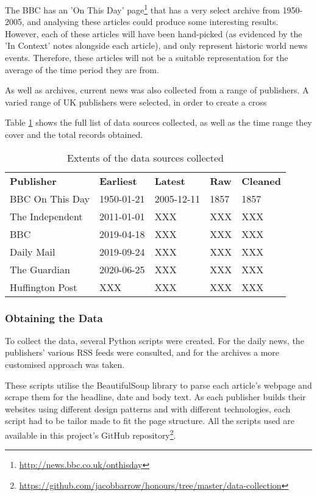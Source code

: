 The BBC has an 'On This Day' page\footnote{\url{http://news.bbc.co.uk/onthisday}} that has a very select archive from 1950-2005, and analysing these articles could produce some interesting results. However, each of these articles will have been hand-picked (as evidenced by the 'In Context' notes alongside each article), and only represent historic world news events. Therefore, these articles will not be a suitable representation for the average of the time period they are from.

As well as archives, current news was also collected from a range of publishers. A varied range of UK publishers were selected, in order to create a cross

Table \ref{tab:data-sources} shows the full list of data sources collected, as well as the time range they cover and the total records obtained.

\begin{table}[h]
\begin{tabular}{lllll}
\textbf{Publisher} & \textbf{Earliest} & \textbf{Latest} & \textbf{Raw} & \textbf{Cleaned} \\
BBC On This Day & 1950-01-21 & 2005-12-11 & 1857 & 1857 \\
The Independent & 2011-01-01 & XXX & XXX & XXX  \\
BBC & 2019-04-18 & XXX & XXX & XXX  \\
Daily Mail & 2019-09-24 & XXX & XXX & XXX \\
The Guardian & 2020-06-25 & XXX & XXX & XXX \\
Huffington Post & XXX & XXX & XXX & XXX \\
\end{tabular}
\caption{Extents of the data sources collected}
\label{tab:data-sources}
\end{table}

\subsubsection{Obtaining the Data} \label{obtaining-data}
To collect the data, several Python scripts were created. For the daily news, the publishers' various RSS feeds were consulted, and for the archives a more customised approach was taken.

These scripts utilise the BeautifulSoup library to parse each article's webpage and scrape them for the headline, date and body text. As each publisher builds their websites using different design patterns and with different technologies, each script had to be tailor made to fit the page structure. All the scripts used are available in this project's GitHub repository\footnote{\url{https://github.com/jacobbarrow/honours/tree/master/data-collection}}.


